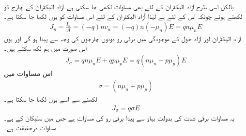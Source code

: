 بالکل اسی طرح آزاد الیکٹران کے لئے بھی مساوات لکھی جا سکتی ہے۔آزاد الیکٹران کے چارج کو  لکھتے ہوئے چونکہ اس کے لئے  ہے لہٰذا آزاد الیکٹران کے لئے اس مساوات کو یوں لکھا جا سکتا ہے۔
\begin{align}
J_n = \frac{I_n}{A}=(-q) n v_n = (-q) n (-\mu_n) E = q n \mu_n E
\end{align}
	آزاد الیکٹران اور آزاد خول کے موجودگی میں برقی رو دونوں چارجوں کی وجہ سے پیدا ہو گی اور یوں اس صورت میں ہم لکھ سکتے ہیں۔
\begin{align}
J_\sigma=q n \mu_n E+ q p \mu_p E=q (n \mu_n+p \mu_p)E
\end{align}
اس مساوات میں  
\begin{align}
\sigma = (n \mu_n+p \mu_p)
\end{align}
لکھنے سے اسے یوں لکھا جا سکتا ہے۔
\begin{align} \label{مساوات_ڈایوڈ_اہم_کا_قانون_الف}
J_\sigma = q \sigma E
\end{align}
یہ مساوات برقی شدت کی بدولت بہاو سے پیدا برقی رو کی مساوات ہے جس میں سلیکان کے   ہے۔مساوات   درحقیقت   ہے۔


